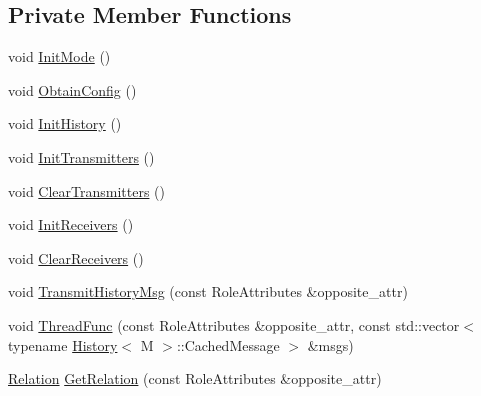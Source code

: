 \subsection*{Private Member Functions}
\begin{DoxyCompactItemize}
\item 
void \hyperlink{classapollo_1_1cyber_1_1transport_1_1HybridTransmitter_a112c505ec2d012c405518a8d26221886}{Init\-Mode} ()
\item 
void \hyperlink{classapollo_1_1cyber_1_1transport_1_1HybridTransmitter_ad69e5147bff4f23df4c58ff0866d440b}{Obtain\-Config} ()
\item 
void \hyperlink{classapollo_1_1cyber_1_1transport_1_1HybridTransmitter_aafab9b42792093c316ac32c181e7d9ba}{Init\-History} ()
\item 
void \hyperlink{classapollo_1_1cyber_1_1transport_1_1HybridTransmitter_a9ee522016a1cedfc360067d759b0b04b}{Init\-Transmitters} ()
\item 
void \hyperlink{classapollo_1_1cyber_1_1transport_1_1HybridTransmitter_ad8fa4eec069e0ceb98273c50fe3ef00f}{Clear\-Transmitters} ()
\item 
void \hyperlink{classapollo_1_1cyber_1_1transport_1_1HybridTransmitter_a3b28ba5a4581e098d607d58d86002d20}{Init\-Receivers} ()
\item 
void \hyperlink{classapollo_1_1cyber_1_1transport_1_1HybridTransmitter_a138a7e206a9d937836dc3ee6f2bd0bdd}{Clear\-Receivers} ()
\item 
void \hyperlink{classapollo_1_1cyber_1_1transport_1_1HybridTransmitter_a6ba2d63c5a73fefbd628bef77951f8f0}{Transmit\-History\-Msg} (const Role\-Attributes \&opposite\-\_\-attr)
\item 
void \hyperlink{classapollo_1_1cyber_1_1transport_1_1HybridTransmitter_a03357a2fe13777d6c6408e49b6c9bb01}{Thread\-Func} (const Role\-Attributes \&opposite\-\_\-attr, const std\-::vector$<$ typename \hyperlink{classapollo_1_1cyber_1_1transport_1_1History}{History}$<$ M $>$\-::Cached\-Message $>$ \&msgs)
\item 
\hyperlink{namespaceapollo_1_1cyber_a688ac951fd0a3965da4acdc34c92e50f}{Relation} \hyperlink{classapollo_1_1cyber_1_1transport_1_1HybridTransmitter_ad71f1d4b5095d514a18e9efd2d249c9b}{Get\-Relation} (const Role\-Attributes \&opposite\-\_\-attr)
\end{DoxyCompactItemize}

